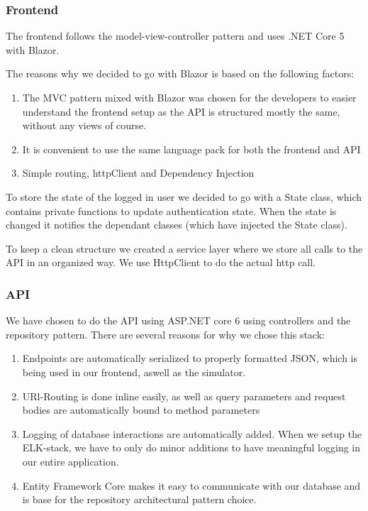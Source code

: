 \documentclass[10pt]{article}
\begin{document}
\subsubsection{Frontend}
\label{frontenddisc}

The frontend follows the model-view-controller pattern and uses .NET Core 5 with Blazor. 

The reasons why we decided to go with Blazor is based on the following factors:
\begin{enumerate}
\item The MVC pattern mixed with Blazor was chosen for the developers to easier understand the frontend setup as the API is structured mostly the same, without any views of course.
\item It is convenient to use the same language pack for both the frontend and API
\item Simple routing, httpClient and Dependency Injection
\end{enumerate}

To store the state of the logged in user we decided to go with a State class, which contains private functions to update authentication state. When the state is changed it notifies the dependant classes (which have injected the State class). 

To keep a clean structure we created a service layer where we store all calls to the API in an organized way. We use HttpClient to do the actual http call. 

\subsubsection{API}
\label{apidisc}
We have chosen to do the API using ASP.NET core 6 using controllers and the repository pattern. There are several reasons for why we chose this stack:
\begin{enumerate}
    \item Endpoints are automatically serialized to properly formatted JSON, which is being used in our frontend, aswell as the simulator.
    \item URl-Routing is done inline easily, as well as query parameters and request bodies are automatically bound to method parameters
    \item Logging of database interactions are automatically added. When we setup the ELK-stack, we have to only do minor additions to have meaningful logging in our entire application.
    \item Entity Framework Core makes it easy to communicate with our database and is base for the repository architectural pattern choice.
\end{enumerate}
\end{document}
